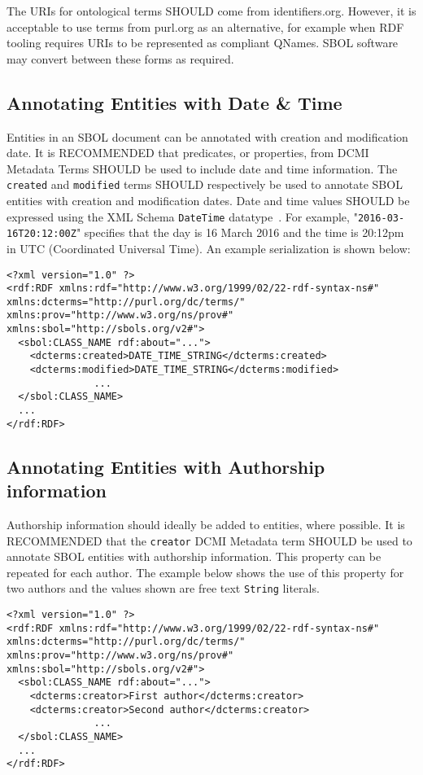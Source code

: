The URIs for ontological terms SHOULD come from identifiers.org.  However, it is acceptable to use terms from purl.org as an alternative, for example when RDF tooling requires URIs to be represented as compliant QNames.  SBOL software may convert between these forms as required.

\subsection{Annotating Entities with Date \& Time}\label{sec:DateTime}
Entities in an SBOL document can be annotated with creation and modification date. It is RECOMMENDED that predicates, or properties, from DCMI Metadata Terms SHOULD be used to include date and time information. The \texttt{created} and \texttt{modified} terms SHOULD respectively be used to annotate SBOL entities with creation and modification dates. Date and time values SHOULD be expressed using the XML Schema \texttt{DateTime} datatype~\citep{Biron2004}. For example, "\texttt{2016-03-16T20:12:00Z}" specifies that the day is 16 March 2016 and the time is 20:12pm in UTC (Coordinated Universal Time). An example serialization is shown below:

\begin{lstlisting}
<?xml version="1.0" ?>
<rdf:RDF xmlns:rdf="http://www.w3.org/1999/02/22-rdf-syntax-ns#" xmlns:dcterms="http://purl.org/dc/terms/" xmlns:prov="http://www.w3.org/ns/prov#" xmlns:sbol="http://sbols.org/v2#">
  <sbol:CLASS_NAME rdf:about="...">
    <dcterms:created>DATE_TIME_STRING</dcterms:created>
    <dcterms:modified>DATE_TIME_STRING</dcterms:modified>
               ...
  </sbol:CLASS_NAME>
  ...
</rdf:RDF>
\end{lstlisting}

\subsection{Annotating Entities with Authorship information}\label{sec:Authorship}
Authorship information should ideally be added to  entities, where possible. It is RECOMMENDED that the \texttt{creator} DCMI Metadata term SHOULD be used to annotate SBOL entities with authorship information. This property can be repeated for each author. The example below shows the use of this property for two authors and the values shown are free text \texttt{String} literals.
\begin{lstlisting}
<?xml version="1.0" ?>
<rdf:RDF xmlns:rdf="http://www.w3.org/1999/02/22-rdf-syntax-ns#" xmlns:dcterms="http://purl.org/dc/terms/" xmlns:prov="http://www.w3.org/ns/prov#" xmlns:sbol="http://sbols.org/v2#">
  <sbol:CLASS_NAME rdf:about="...">
    <dcterms:creator>First author</dcterms:creator>
    <dcterms:creator>Second author</dcterms:creator>
               ...
  </sbol:CLASS_NAME>
  ...
</rdf:RDF>
\end{lstlisting}

